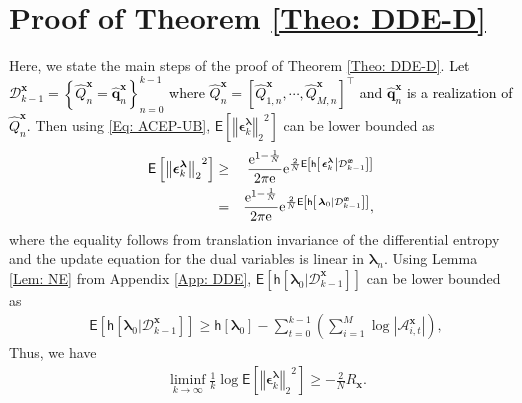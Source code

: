 \documentclass[10pt,twocolumn,twoside]{IEEEtran}
\begin{document}
\section{Proof of Theorem \ref{Theo: DDE-D}}\label{App: DDE-D}
Here, we state the main steps of the proof of Theorem \ref{Theo: DDE-D}. \textcolor{black}{Let $\mathcal{D}^{{\ensuremath{\boldsymbol{{x}}}}}_{k-1}=\left\{\hat{Q}^{{\ensuremath{\boldsymbol{{x}}}}}_{n}={\ensuremath{\boldsymbol{{\hat{q}}}}}^{{\ensuremath{\boldsymbol{{x}}}}}_n\right\}_{n=0}^{k-1}$ where $\hat{Q}^{{\ensuremath{\boldsymbol{{x}}}}}_n=\left[\hat{Q}^{{\ensuremath{\boldsymbol{{x}}}}}_{1,n},\cdots,\hat{Q}^{{\ensuremath{\boldsymbol{{x}}}}}_{M,n}\right]^\top$ and ${\ensuremath{\boldsymbol{{\hat{q}}}}}^{{\ensuremath{\boldsymbol{{x}}}}}_n$ is a realization of $\hat{Q}^{{\ensuremath{\boldsymbol{{x}}}}}_n$.} Then using \eqref{Eq: ACEP-UB}, ${\ensuremath{\mathsf{E}\left[{{\left\Vert{{\ensuremath{\boldsymbol{{\epsilon}}}}_k^{{\ensuremath{\boldsymbol{{\lambda}}}}}}\right\Vert_{{2}}}^2} \right]}}$ can be lower bounded as
\begin{eqnarray}
{\ensuremath{\mathsf{E}\left[{{\left\Vert{{\ensuremath{\boldsymbol{{\epsilon}}}}_k^{{\ensuremath{\boldsymbol{{\lambda}}}}}}\right\Vert_{{2}}}^2} \right]}}&\geq &\frac{{\ensuremath{{\rm e}^{{1-\frac{1}{N}}}}}}{{2\pi {\ensuremath{{\rm e}^{{}}}}}}{\ensuremath{{\rm e}^{{\frac{2}{N}{\ensuremath{\mathsf{E}\left[{{\ensuremath{\mathsf{h}\left[\left.{{\ensuremath{\boldsymbol{{\epsilon}}}}_k^{{\ensuremath{\boldsymbol{{\lambda}}}}}}\right|{\mathcal{D}^{{\ensuremath{\boldsymbol{{x}}}}}_{k-1}}\right]}}} \right]}}}}}}\nonumber\\
&=&\frac{{\ensuremath{{\rm e}^{{1-\frac{1}{N}}}}}}{{2\pi {\ensuremath{{\rm e}^{{}}}}}}{\ensuremath{{\rm e}^{{\frac{2}{N}{\ensuremath{\mathsf{E}\left[{{\ensuremath{\mathsf{h}\left[\left.{{\ensuremath{\boldsymbol{{\lambda}}}}_0}\right|{\mathcal{D}^{{\ensuremath{\boldsymbol{{x}}}}}_{k-1}}\right]}}} \right]}}}}}},
\end{eqnarray}
where the equality follows from translation invariance of the differential entropy and the update equation for the dual variables is linear in ${\ensuremath{\boldsymbol{{\lambda}}}}_{n}$. Using Lemma \ref{Lem: NE} from Appendix \ref{App: DDE}, ${\ensuremath{\mathsf{E}\left[{{\ensuremath{\mathsf{h}\left[\left.{{\ensuremath{\boldsymbol{{\lambda}}}}_{0}}\right|{\mathcal{D}^{{\ensuremath{\boldsymbol{{x}}}}}_{k-1}}\right]}}} \right]}}$ can be lower bounded as
\begin{align}
&{\ensuremath{\mathsf{E}\left[{{\ensuremath{\mathsf{h}\left[\left.{{\ensuremath{\boldsymbol{{\lambda}}}}_{0}}\right|{\mathcal{D}^{{\ensuremath{\boldsymbol{{x}}}}}_{k-1}}\right]}}} \right]}}\geq \mathsf{h}\left[{\ensuremath{\boldsymbol{{\lambda}}}}_{0}\right]-\sum_{t=0}^{k-1}{\left({\sum_{i=1}^M\log{\left|{\mathcal{A}^{{\ensuremath{\boldsymbol{{x}}}}}_{i,t}}\right|}}\right)},
\end{align}
Thus, we have
\begin{align}
&\liminf_{k\longrightarrow\infty}\frac{1}{k}\log{\ensuremath{\mathsf{E}\left[{{\left\Vert{{\ensuremath{\boldsymbol{{\epsilon}}}}^{{\ensuremath{\boldsymbol{{\lambda}}}}}_k}\right\Vert_{{2}}}^2} \right]}}\geq -\frac{2}{N} R_{{\ensuremath{\boldsymbol{{x}}}}}.
\end{align}
\end{document}
